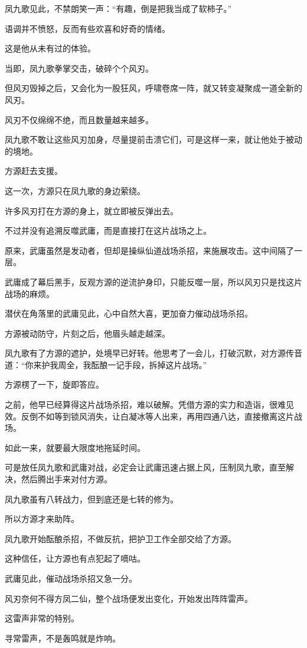 \begin{this_body}
凤九歌见此，不禁朗笑一声：“有趣，倒是把我当成了软柿子。”

语调并不愤怒，反而有些欢喜和好奇的情绪。

这是他从未有过的体验。

当即，凤九歌拳掌交击，破碎个个风刃。

但风刃毁掉之后，又会化为一股狂风，呼啸卷席一阵，就又转变凝聚成一道全新的风刃。

风刃不仅绵绵不绝，而且数量越来越多。

凤九歌不敢让这些风刃加身，尽量提前击溃它们，可是这样一来，就让他处于被动的境地。

方源赶去支援。

这一次，方源只在凤九歌的身边萦绕。

许多风刃打在方源的身上，就立即被反弹出去。

不过并没有追溯反噬武庸，而是直接打在这片战场之上。

原来，武庸虽然是发动者，但却是操纵仙道战场杀招，来施展攻击。这中间隔了一层。

武庸成了幕后黑手，反观方源的逆流护身印，只能反噬一层，所以风刃只是找这片战场的麻烦。

潜伏在角落里的武庸见此，心中自然大喜，更加奋力催动战场杀招。

方源被动防守，片刻之后，他眉头越走越深。

凤九歌有了方源的遮护，处境早已好转。他思考了一会儿，打破沉默，对方源传音道：“你来护我周全，我酝酿一记手段，拆掉这片战场。”

方源楞了一下，旋即答应。

之前，他早已经算得这片战场杀招，难以破解。凭借方源的实力和造诣，很难见效。反倒不如等到锁风消失，让白凝冰等人出来，再用四通八达，直接撤离这片战场。

如此一来，就要最大限度地拖延时间。

可是放任凤九歌和武庸对战，必定会让武庸迅速占据上风，压制凤九歌，直至解决，然后腾出手来对付方源。

凤九歌虽有八转战力，但到底还是七转的修为。

所以方源才来助阵。

凤九歌开始酝酿杀招，不做反抗，把护卫工作全部交给了方源。

这种信任，让方源也有点犯起了嘀咕。

武庸见此，催动战场杀招又急一分。

风刃奈何不得方凤二仙，整个战场便发出变化，开始发出阵阵雷声。

这雷声非常的特别。

寻常雷声，不是轰鸣就是炸响。


\end{this_body}
